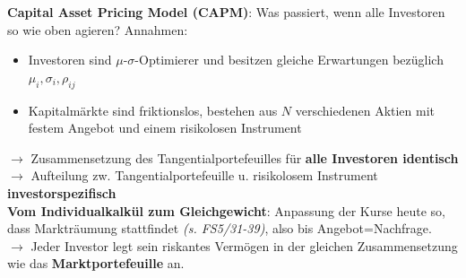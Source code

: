 \bigskip
\textbf{Capital Asset Pricing Model (CAPM)}: Was passiert, wenn alle Investoren so wie oben agieren?
Annahmen:
\begin{itemize}
	\item Investoren sind $\mu\text{-}\sigma$-Optimierer und besitzen gleiche Erwartungen bezüglich $\mu_i,\sigma_i,\rho_{ij}$
	\item Kapitalmärkte sind friktionslos, bestehen aus $N$ verschiedenen Aktien mit festem Angebot und einem risikolosen Instrument
\end{itemize}
$\rightarrow$ Zusammensetzung des Tangentialportefeuilles für \textbf{alle Investoren identisch}\\
$\rightarrow$ Aufteilung zw. Tangentialportefeuille u. risikolosem Instrument \textbf{investorspezifisch}\\

\textbf{Vom Individualkalkül zum Gleichgewicht}:
Anpassung der Kurse heute so, dass Markträumung stattfindet \textit{(s. FS5/31-39)}, also bis Angebot=Nachfrage.\\
$\rightarrow$ Jeder Investor legt sein riskantes Vermögen in der gleichen Zusammensetzung wie das \textbf{Marktportefeuille} an.

